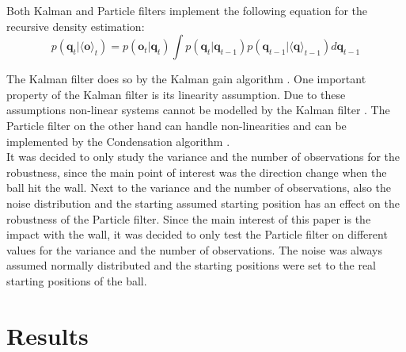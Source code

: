 \documentclass[conference]{IEEEtran}
\begin{document}
Both Kalman and Particle filters implement the following equation for the recursive density estimation:
\begin{equation*}
    p(\textbf{q}_t | \langle \textbf{o} \rangle _t) =
    p(\textbf{o}_t | \textbf{q}_t) \int p(\textbf{q}_t | \textbf{q}_{t-1}) p(\textbf{q}_{t-1} | \langle \textbf{q} \rangle _{t-1}) d \textbf{q}_{t-1}
\tag{5}
\end{equation*}

The Kalman filter does so by the Kalman gain algorithm \cite{b2}.
One important property of the Kalman filter is its linearity assumption.
Due to these assumptions non-linear systems cannot be modelled by the Kalman filter \cite{b2}. %
The Particle filter on the other hand can handle non-linearities and can be implemented by the Condensation algorithm \cite{b3}. \\
It was decided to only study the variance and the number of observations for the robustness, since the main point of interest was the direction change when the ball hit the wall.
Next to the variance and the number of observations, also the noise distribution and the starting assumed starting position has an effect on the robustness of the Particle filter.
Since the main interest of this paper is the impact with the wall, it was decided to only test the Particle filter on different values for the variance and the number of observations.
The noise was always assumed normally distributed and the starting positions were set to the real starting positions of the ball.





\section{Results}
\end{document}
